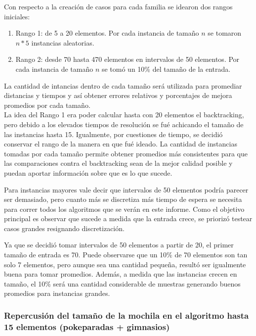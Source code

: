 Con respecto a la creación de casos para cada familia se idearon dos rangos iniciales:

\begin{enumerate}
\item Rango 1: de 5 a 20 elementos. Por cada instancia de tamaño $n$ se tomaron $n*5$ instancias aleatorias.
\item Rango 2: desde 70 hasta 470 elementos en intervalos de 50 elementos. Por cada instancia de tamaño $n$ se tomó un 10\% del tamaño de la entrada. 
\end{enumerate}

La cantidad de intancias dentro de cada tamaño será utilizada para promediar distancias y tiempos y así obtener errores relativos y porcentajes de mejora promedios por cada tamaño.\\

La idea del Rango 1 era poder calcular hasta con 20 elementos el backtracking, pero debido a los elevados tiempos de resolución se fué achicando el tamaño de las instancias hasta 15. Igualmente, por cuestiones de tiempo, se decidió conservar el rango de la manera en que fué ideado. La cantidad de instancias tomadas por cada tamaño permite obtener promedios más consistentes para que las comparaciones contra el backtracking sean de la mejor calidad posible y puedan aportar información sobre que es lo que sucede.

Para instancias mayores vale decir que intervalos de 50 elementos podría parecer ser demasiado, pero cuanto más se discretiza más tiempo de espera se necesita para correr todos los algoritmos que se verán en este informe. Como el objetivo principal es observar que sucede a medida que la entrada crece, se priorizó testear casos grandes resignando discretización. 

Ya que se decidió tomar intervalos de 50 elementos a partir de 20, el primer tamaño de entrada es 70. Puede observarse que un 10\% de 70 elementos son tan solo 7 elementos, pero aunque sea una cantidad pequeña, resultó ser igualmente buena para tomar promedios. Además, a medida que las instancias crecen en tamaño, el 10\% será una cantidad considerable de muestras generando buenos promedios para instancias grandes.

\newpage   

\subsubsection*{Repercusi\'on del tamaño de la mochila en el algoritmo hasta 15 elementos (pokeparadas + gimnasios)}

